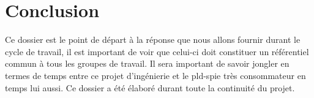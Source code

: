     
    \section{Conclusion}
Ce dossier est le point de départ à la réponse que nous allons fournir durant le cycle de travail, il est important de voir que celui-ci doit constituer un référentiel commun à tous les groupes de travail. Il sera important de savoir jongler en termes de temps entre ce projet d'ingénierie et le pld-spie très consommateur en temps lui aussi. Ce dossier a été élaboré durant toute la continuité du projet.   
